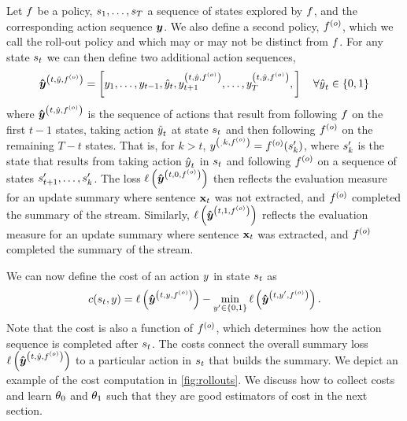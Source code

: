 Let $f$ be a policy, $s_1,\ldots,s_T$ a sequence of states
explored by $f$, and the corresponding action sequence $\boldsymbol{y}$. We also
define a second policy, $f^{(o)}$, which we call the roll-out policy
and which may or may not be distinct from $f$.  For any state $s_t$
we can then define two additional action sequences,
\[
    \boldsymbol{\hat{\boldsymbol{y}}}^{\left(t,\hat{y},f^{(o)}\right)} = \left[
        y_1, 
        \ldots, 
        y_{t-1},
        \hat{y}_t,
        y^{\left(t,\hat{y},f^{(o)}\right)}_{t+1}, 
        \ldots, 
        y^{\left(t,\hat{y},f^{(o)}\right)}_{T}, 
    \right] \quad \forall {\hat{y}}_t \in \{0,1\} 
\] 
where $\boldsymbol{\hat{\boldsymbol{y}}}^{\left(t,\hat{y},f^{(o)}\right)}$ is the sequence of actions that result from following
$f$ on the first $t-1$ states, taking action ${\hat{y}}_t$ at state
$s_t$ and then following $f^{(o)}$ on the remaining $T - t$
states. That is, for $k > t$, $y^{\left(_,k,f^{(o)}\right)} = f^{(o)}(s^\prime_k)$,
where $s^\prime_k$ is the state that results from taking action
${\hat{y}}_t$ in $s_t$ and following $f^{(o)}$ on a sequence of
states $s^\prime_{t+1}, \ldots, s^\prime_k$. The loss
$\ell\left( \boldsymbol{\hat{\boldsymbol{y}}}^{\left(t,0,f^{(o)}\right)} \right)$ then reflects the evaluation measure
for an update summary where sentence $\mathbf{x}_t$ was not extracted, and
$f^{(o)}$ completed the summary of the stream. Similarly,
$\ell\left( \boldsymbol{\hat{\boldsymbol{y}}}^{\left(t,1,f^{(o)}\right)}  \right)$ reflects the evaluation measure for
an update summary where sentence $\mathbf{x}_t$ was extracted, and
$f^{(o)}$ completed the summary of the stream. 
 
We can now define the cost of an action $y$ in state $s_t$ as 
\[ 
    c(s_t, y) = 
        \ell\left(\boldsymbol{\hat{\boldsymbol{y}}}^{\left(t,y,f^{(o)}\right)}   \right) 
            - \min_{y^\prime \in \{0,1\} }
                \ell\left( \boldsymbol{\hat{\boldsymbol{y}}}^{\left(t,y^\prime,f^{(o)}\right)} \right).
\]
Note that the cost is also a function of $f^{(o)}$, which determines
how the action sequence is completed after $s_t$. 
The costs connect the overall summary loss $\ell\left(\boldsymbol{\hat{\boldsymbol{y}}}^{\left(t,\hat{y},f^{(o)}\right)}\right)$
to a particular action in $s_t$ that builds the summary.
We depict an example of the cost computation in \autoref{fig:rollouts}.
 We discuss how to collect costs and learn $\theta_0$
and $\theta_1$ such that they are good estimators of cost in the next section.
 




